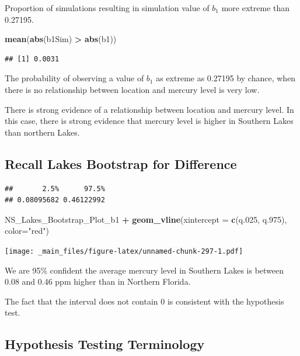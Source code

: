 \documentclass[]{book}
\newenvironment{Shaded}{\begin{snugshade}}{\end{snugshade}}
\newcommand{\KeywordTok}[1]{\textcolor[rgb]{0.13,0.29,0.53}{\textbf{#1}}}
\newcommand{\DataTypeTok}[1]{\textcolor[rgb]{0.13,0.29,0.53}{#1}}
\newcommand{\DecValTok}[1]{\textcolor[rgb]{0.00,0.00,0.81}{#1}}
\newcommand{\StringTok}[1]{\textcolor[rgb]{0.31,0.60,0.02}{#1}}
\newcommand{\OperatorTok}[1]{\textcolor[rgb]{0.81,0.36,0.00}{\textbf{#1}}}
\newcommand{\NormalTok}[1]{#1}
\begin{document}
Proportion of simulations resulting in simulation value of \(b_1\) more
extreme than 0.27195.

\begin{Shaded}
\begin{Highlighting}[]
\KeywordTok{mean}\NormalTok{(}\KeywordTok{abs}\NormalTok{(b1Sim) }\OperatorTok{>}\StringTok{ }\KeywordTok{abs}\NormalTok{(b1))}
\end{Highlighting}
\end{Shaded}

\begin{verbatim}
## [1] 0.0031
\end{verbatim}

The probability of observing a value of \(b_1\) as extreme as 0.27195 by
chance, when there is no relationship between location and mercury level
is very low.

There is strong evidence of a relationship between location and mercury
level. In this case, there is strong evidence that mercury level is
higher in Southern Lakes than northern Lakes.

\subsection{Recall Lakes Bootstrap for
Difference}\label{recall-lakes-bootstrap-for-difference}

\begin{verbatim}
##       2.5%      97.5% 
## 0.08095682 0.46122992
\end{verbatim}

\begin{Shaded}
\begin{Highlighting}[]
\NormalTok{NS_Lakes_Bootstrap_Plot_b1 }\OperatorTok{+}\StringTok{ }\KeywordTok{geom_vline}\NormalTok{(}\DataTypeTok{xintercept =} \KeywordTok{c}\NormalTok{(q.}\DecValTok{025}\NormalTok{, q.}\DecValTok{975}\NormalTok{), }\DataTypeTok{color=}\StringTok{"red"}\NormalTok{)}
\end{Highlighting}
\end{Shaded}

\texttt{[image: \_main\_files/figure-latex/unnamed-chunk-297-1.pdf]}

We are 95\% confident the average mercury level in Southern Lakes is
between 0.08 and 0.46 ppm higher than in Northern Florida.

The fact that the interval does not contain 0 is consistent with the
hypothesis test.

\subsection{Hypothesis Testing
Terminology}\label{hypothesis-testing-terminology}
\end{document}
